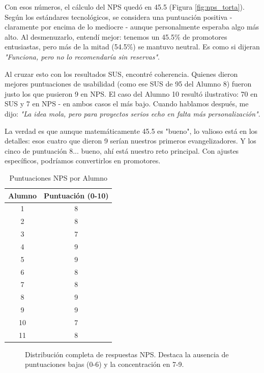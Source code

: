 Con esos números, el cálculo del NPS quedó en 45.5 (Figura \ref{fig:nps_torta}). Según los estándares tecnológicos, se considera una puntuación positiva - claramente por encima de lo mediocre - aunque personalmente esperaba algo más alto. Al desmenuzarlo, entendí mejor: tenemos un 45.5\% de promotores entusiastas, pero más de la mitad (54.5\%) se mantuvo neutral. Es como si dijeran \textit{"Funciona, pero no lo recomendaría sin reservas"}.

Al cruzar esto con los resultados SUS, encontré coherencia. Quienes dieron mejores puntuaciones de usabilidad (como ese SUS de 95 del Alumno 8) fueron justo los que pusieron 9 en NPS. El caso del Alumno 10 resultó ilustrativo: 70 en SUS y 7 en NPS - en ambos casos el más bajo. Cuando hablamos después, me dijo: \textit{"La idea mola, pero para proyectos serios echo en falta más personalización"}.

La verdad es que aunque matemáticamente 45.5 es "bueno", lo valioso está en los detalles: esos cuatro que dieron 9 serían nuestros primeros evangelizadores. Y los cinco de puntuación 8... bueno, ahí está nuestro reto principal. Con ajustes específicos, podríamos convertirlos en promotores.

\begin{table}[h]
	\centering
	\caption{Puntuaciones NPS por Alumno}
	\label{tab:nps_scores}
	\begin{tabular}{|c|c|}
		\hline
		\textbf{Alumno} & \textbf{Puntuación (0-10)} \\ \hline
		1 & 8 \\ \hline
		2 & 8 \\ \hline
		3 & 7 \\ \hline
		4 & 9 \\ \hline
		5 & 9 \\ \hline
		6 & 8 \\ \hline
		7 & 8 \\ \hline
		8 & 9 \\ \hline
		9 & 9 \\ \hline
		10 & 7 \\ \hline
		11 & 8 \\ \hline
	\end{tabular}
\end{table}

\begin{figure}[h]
	\centering
	\caption{Distribución completa de respuestas NPS. Destaca la ausencia de puntuaciones bajas (0-6) y la concentración en 7-9.}
	\label{fig:nps_symbolic}
\end{figure}

